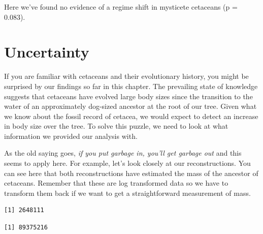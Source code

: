 \documentclass[
]{book}
\newenvironment{Shaded}{\begin{snugshade}}{\end{snugshade}}
\newcommand{\DecValTok}[1]{\textcolor[rgb]{0.00,0.00,0.81}{#1}}
\newcommand{\FloatTok}[1]{\textcolor[rgb]{0.00,0.00,0.81}{#1}}
\newcommand{\NormalTok}[1]{#1}
\newcommand{\OperatorTok}[1]{\textcolor[rgb]{0.81,0.36,0.00}{\textbf{#1}}}
\begin{document}
Here we've found no evidence of a regime shift in mysticete cetaceans (p = 0.083).

\hypertarget{uncertainty}{%
\section{Uncertainty}\label{uncertainty}}

If you are familiar with cetaceans and their evolutionary history, you might be surprised by our findings so far in this chapter. The prevailing state of knowledge suggests that cetaceans have evolved large body sizes since the transition to the water of an approximately dog-sized ancestor at the root of our tree. Given what we know about the fossil record of cetacea, we would expect to detect an increase in body size over the tree. To solve this puzzle, we need to look at what information we provided our analysis with.

As the old saying goes, \emph{if you put garbage in, you'll get garbage out} and this seems to apply here. For example, let's look closely at our reconstructions. You can see here that both reconstructions have estimated the mass of the ancestor of cetaceans. Remember that these are log transformed data so we have to transform them back if we want to get a straightforward measurement of mass.

\begin{Shaded}
\end{Shaded}

\begin{verbatim}
[1] 2648111
\end{verbatim}

\begin{Shaded}
\end{Shaded}

\begin{verbatim}
[1] 89375216
\end{verbatim}
\end{document}
